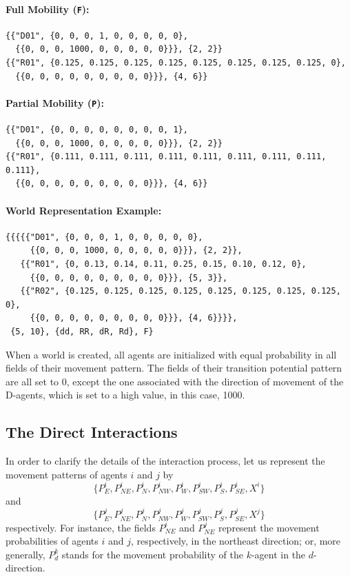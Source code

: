 \documentclass[11pt, a4paper]{article}
\begin{document}
\paragraph{Full Mobility (\texttt{F}):}
\begin{verbatim}
{{"D01", {0, 0, 0, 1, 0, 0, 0, 0, 0},
  {{0, 0, 0, 1000, 0, 0, 0, 0, 0}}}, {2, 2}}
{{"R01", {0.125, 0.125, 0.125, 0.125, 0.125, 0.125, 0.125, 0.125, 0},
  {{0, 0, 0, 0, 0, 0, 0, 0, 0}}}, {4, 6}}
\end{verbatim}

\paragraph{Partial Mobility (\texttt{P}):}
\begin{verbatim}
{{"D01", {0, 0, 0, 0, 0, 0, 0, 0, 1},
  {{0, 0, 0, 1000, 0, 0, 0, 0, 0}}}, {2, 2}}
{{"R01", {0.111, 0.111, 0.111, 0.111, 0.111, 0.111, 0.111, 0.111, 0.111},
  {{0, 0, 0, 0, 0, 0, 0, 0, 0}}}, {4, 6}}
\end{verbatim}

\paragraph{World Representation Example:}
\begin{verbatim}
{{{{{"D01", {0, 0, 0, 1, 0, 0, 0, 0, 0},
     {{0, 0, 0, 1000, 0, 0, 0, 0, 0}}}, {2, 2}},
   {{"R01", {0, 0.13, 0.14, 0.11, 0.25, 0.15, 0.10, 0.12, 0},
     {{0, 0, 0, 0, 0, 0, 0, 0, 0}}}, {5, 3}},
   {{"R02", {0.125, 0.125, 0.125, 0.125, 0.125, 0.125, 0.125, 0.125, 0},
     {{0, 0, 0, 0, 0, 0, 0, 0, 0}}}, {4, 6}}}},
 {5, 10}, {dd, RR, dR, Rd}, F}
\end{verbatim}

When a world is created, all agents are initialized with equal probability in all fields of their movement pattern. The fields of their transition potential pattern are all set to 0, except the one associated with the direction of movement of the D-agents, which is set to a high value, in this case, 1000.

\subsection{The Direct Interactions}

In order to clarify the details of the interaction process, let us represent the movement patterns of agents $i$ and $j$ by
\[
\{P_{E}^{i},P_{NE}^{i},P_{N}^{i},P_{NW}^{i},P_{W}^{i},P_{SW}^{i},P_{S}^{i},P_{SE}^{i},X^{i}\}
\]
and
\[
\{P_{E}^{j},P_{NE}^{j},P_{N}^{j},P_{NW}^{j},P_{W}^{j},P_{SW}^{j},P_{S}^{j},P_{SE}^{j},X^{j}\}
\]
respectively. For instance, the fields $P_{NE}^{i}$ and $P_{NE}^{j}$ represent the movement probabilities of agents $i$ and $j$, respectively, in the northeast direction; or, more generally, $P_{d}^{k}$ stands for the movement probability of the $k$-agent in the $d$-direction.
\end{document}
